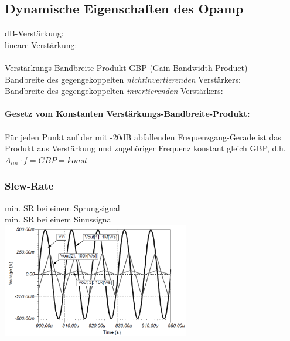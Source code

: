		\subsection{Dynamische Eigenschaften des Opamp }
			\begin{minipage}{18cm}
            	dB-Verstärkung: \hspace{4.5mm}
            	\\
            	lineare Verstärkung:
            	\\ \\
            	Verstärkungs-Bandbreite-Produkt GBP (Gain-Bandwidth-Product)\\
            	Bandbreite des gegengekoppelten {\it nichtinvertierenden} Verstärkers:
            	\\
            	Bandbreite des gegengekoppelten {\it invertierenden} Verstärkers: \hspace{6.5mm}
            	\\ \\
            	{\bf Gesetz vom Konstanten Verstärkungs-Bandbreite-Produkt:} \\ \\
            	Für jeden Punkt auf der mit -20dB abfallenden Frequenzgang-Gerade ist das
            	Produkt aus Verstärkung und zugehöriger Frequenz konstant gleich GBP, d.h. $A_{lin}\cdot f=GBP=konst$\\
            \end{minipage}
		\subsubsection{Slew-Rate}
		min. SR bei einem Sprungsignal \hspace{4mm}
		\\ 
		min. SR bei einem Sinussignal \hspace{4.5mm} 
		\\
		\includegraphics[height=5cm]{./bilder/slew-rate.png}\\

